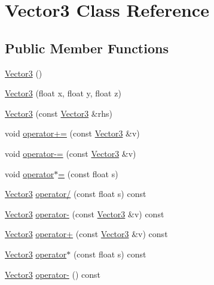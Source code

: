 \hypertarget{class_vector3}{}\section{Vector3 Class Reference}
\label{class_vector3}
\subsection*{Public Member Functions}
\begin{DoxyCompactItemize}
\item 
\hyperlink{class_vector3_a0f49191f7e001e7f7ae1cb49522118b4}{Vector3} ()
\item 
\hyperlink{class_vector3_ad53e22b52babdb90d423601f72467590}{Vector3} (float x, float y, float z)
\item 
\hyperlink{class_vector3_ae1d084ff898241c341e322fba12ceed7}{Vector3} (const \hyperlink{class_vector3}{Vector3} \&rhs)
\item 
void \hyperlink{class_vector3_a8ca014e8dd19bb3a2d483660d9829c9b}{operator+=} (const \hyperlink{class_vector3}{Vector3} \&v)
\item 
void \hyperlink{class_vector3_a6b592312b3e64f655b85313afe3a5cf2}{operator-\/=} (const \hyperlink{class_vector3}{Vector3} \&v)
\item 
void \hyperlink{class_vector3_afa90067f8be9337f4274b428bb3fd39f}{operator$\ast$=} (const float s)
\item 
\hyperlink{class_vector3}{Vector3} \hyperlink{class_vector3_a654d3c51f2a4f1771cb5779f1a747da1}{operator/} (const float s) const 
\item 
\hyperlink{class_vector3}{Vector3} \hyperlink{class_vector3_adf9aba350d84593481892bb802190402}{operator-\/} (const \hyperlink{class_vector3}{Vector3} \&v) const 
\item 
\hyperlink{class_vector3}{Vector3} \hyperlink{class_vector3_a1b5bb43ee5524cd793c3dc7c44ba507b}{operator+} (const \hyperlink{class_vector3}{Vector3} \&v) const 
\item 
\hyperlink{class_vector3}{Vector3} \hyperlink{class_vector3_aef0d9113f65362414488a8e48690a894}{operator$\ast$} (const float s) const 
\item 
\hyperlink{class_vector3}{Vector3} \hyperlink{class_vector3_a72a36c71164f1532d24ec49c3d7056fc}{operator-\/} () const 
\end{DoxyCompactItemize}
